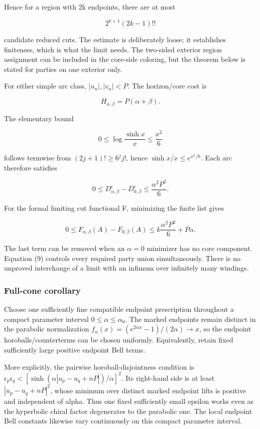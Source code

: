 \documentclass[11pt]{article}
\begin{document}
Hence for a region with 2k endpoints, there are at most

\[
2^{k+1}(2k-1)!!
\]

candidate reduced cuts. The estimate is deliberately loose; it
establishes finiteness, which is what the limit needs. The two-sided
exterior region assignment can be included in the core-side coloring,
but the theorem below is stated for parties on one exterior only.

For either simple arc class, \(|u_n|,|v_n|<P\). The horizon/core cost is

\[
H_{\alpha,\beta}=P(\alpha+\beta).
\tag{6}
\]

The elementary bound

\[
0\le\log\frac{\sinh x}{x}\le\frac{x^2}{6}
\tag{7}
\]

follows termwise from \((2j+1)!\ge6^j j!\), hence
\(\sinh x/x\le e^{x^2/6}\). Each arc therefore satisfies

\[
0\le D_{\alpha,\beta}^{\epsilon}-D_{0,\beta}^{\epsilon}
\le\frac{\alpha^2P^2}{6}.
\tag{8}
\]

For the formal limiting cut functional F, minimizing the finite list
gives

\[
\boxed{
0\le F_{\alpha,\beta}(A)-F_{0,\beta}(A)
\le k\frac{\alpha^2P^2}{6}+P\alpha.
}
\tag{9}
\]

The last term can be removed when an \(\alpha=0\) minimizer has no core
component. Equation (9) controls every required party union
simultaneously. There is no unproved interchange of a limit with an
infimum over infinitely many windings.

\subsubsection{Full-cone corollary}\label{full-cone-corollary}

Choose one sufficiently fine compatible endpoint prescription throughout
a compact parameter interval \(0\le\alpha\le\alpha_0\). The marked
endpoints remain distinct in the parabolic normalization
\(f_\alpha(x)=(e^{2\alpha x}-1)/(2\alpha)\to x\), so the endpoint
horoballs/counterterms can be chosen uniformly. Equivalently, retain
fixed sufficiently large positive endpoint Bell terms.

More explicitly, the pairwise horoball-disjointness condition is
\(\epsilon_p\epsilon_q< [\sinh(\alpha|u_p-u_q+nP|)/\alpha]^2\). Its
right-hand side is at least \(|u_p-u_q+nP|^2\), whose minimum over
distinct marked endpoint lifts is positive and independent of alpha.
Thus one fixed sufficiently small epsilon works even as the hyperbolic
chiral factor degenerates to the parabolic one. The local endpoint Bell
constants likewise vary continuously on this compact parameter interval.
\end{document}
